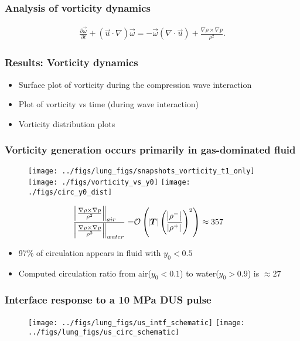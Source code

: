 \begin{frame} \frametitle{Analysis of vorticity dynamics}%
  \begin{align*}
  \frac{\partial \vec{\omega}}{\partial t}+\left(\vec{u}\cdot\nabla\right)\vec{\omega} =%
  - \vec{\omega}\left(\nabla\cdot\vec{u}\right) + \frac{\nabla\rho\times\nabla p}{\rho^2}.%
  \end{align*}
\end{frame}
\begin{frame} \frametitle{Results: Vorticity dynamics}
  \begin{itemize}
  \item Surface plot of vorticity during the compression wave interaction
  \item Plot of vorticity vs time (during wave interaction)
  \item Vorticity distribution plots
  \end{itemize}
\end{frame}
\begin{frame} \frametitle{Vorticity generation occurs primarily in gas-dominated fluid}
\vspace*{-.5cm}
{\scriptsize
    \begin{figure}
    \centering
    \hfill
    \texttt{[image: ../figs/lung\_figs/snapshots\_vorticity\_t1\_only]} \hfill
    \texttt{[image: ./figs/vorticity\_vs\_y0]} \hfill
    \texttt{[image: ./figs/circ\_y0\_dist]}
    \hfill
  \end{figure}
  \vspace*{-.3cm}
  \begin{align*}%
    \frac{\norm{\frac{\nabla\rho\times\nabla p}{\rho^2}}_{air\quad}}{\norm{\frac{\nabla\rho\times\nabla p}{\rho^2}}_{water}}%
    =&\orderof{\abs{\boldsymbol{T}}\left(\frac{\abs{\rho^-}}{\abs{\rho^+}}\right)^2}%
    \approx 357
  \end{align*}
  \vspace*{-.25cm}
  \begin{itemize}
    \item 97\% of circulation appears in fluid with $y_0<0.5$
    \item Computed circulation ratio from air($y_0<0.1$) to water($y_0>0.9$) is $\approx 27$
  \end{itemize}
}
\end{frame}
\begin{frame} \frametitle{Interface response to a 10 MPa DUS pulse}
  \begin{figure}
    \centering
    \texttt{[image: ../figs/lung\_figs/us\_intf\_schematic]} \hfill
    \texttt{[image: ../figs/lung\_figs/us\_circ\_schematic]}
  \end{figure}
\end{frame}
